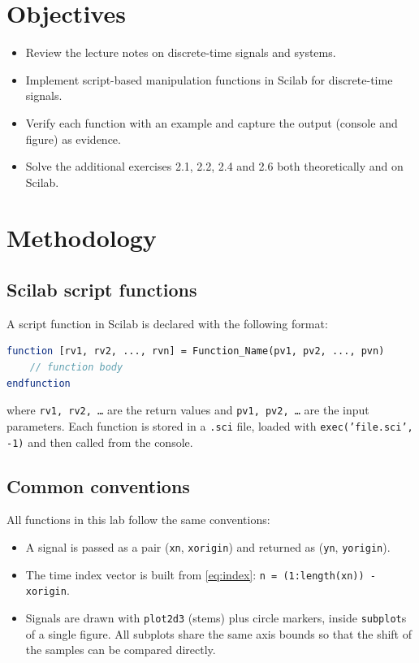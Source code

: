 \documentclass[12pt,a4paper]{article}
\begin{document}
\section{Objectives}
\begin{itemize}
    \item Review the lecture notes on discrete-time signals and systems.
    \item Implement script-based manipulation functions in Scilab for discrete-time signals.
    \item Verify each function with an example and capture the output (console and figure) as evidence.
    \item Solve the additional exercises 2.1, 2.2, 2.4 and 2.6 both theoretically and on Scilab.
\end{itemize}

\section{Methodology}
\subsection{Scilab script functions}
A script function in Scilab is declared with the following format:
\begin{lstlisting}[language=Scilab]
function [rv1, rv2, ..., rvn] = Function_Name(pv1, pv2, ..., pvn)
    // function body
endfunction
\end{lstlisting}
where \texttt{rv1, rv2, \dots} are the return values and \texttt{pv1, pv2, \dots} are the input parameters. Each function is stored in a \texttt{.sci} file, loaded with \texttt{exec('file.sci', -1)} and then called from the console.

\subsection{Common conventions}
All functions in this lab follow the same conventions:
\begin{itemize}
    \item A signal is passed as a pair (\texttt{xn}, \texttt{xorigin}) and returned as (\texttt{yn}, \texttt{yorigin}).
    \item The time index vector is built from \eqref{eq:index}: \texttt{n = (1:length(xn)) - xorigin}.
    \item Signals are drawn with \texttt{plot2d3} (stems) plus circle markers, inside \texttt{subplot}s of a single figure. All subplots share the same axis bounds so that the shift of the samples can be compared directly.
\end{itemize}
\end{document}

